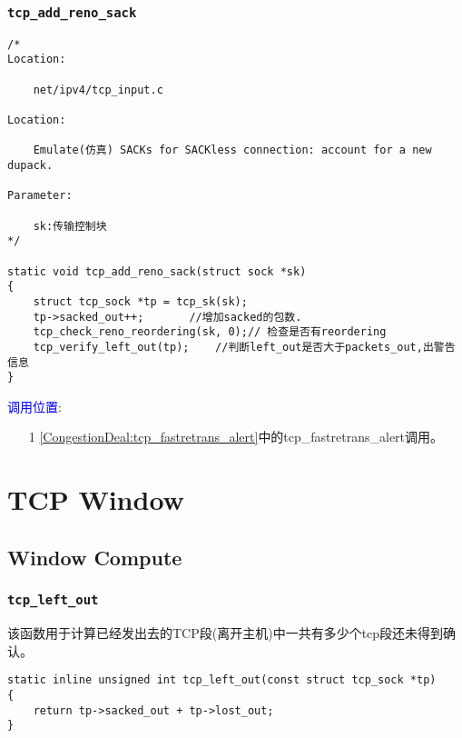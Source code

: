         \subsubsection{\texttt{tcp_add_reno_sack}}
            \label{ACKUpdate:tcp_add_reno_sack}
\begin{verbatim}
/* 
Location:

    net/ipv4/tcp_input.c

Location:

    Emulate(仿真) SACKs for SACKless connection: account for a new dupack.

Parameter:

    sk:传输控制块
*/

static void tcp_add_reno_sack(struct sock *sk)
{
    struct tcp_sock *tp = tcp_sk(sk);
    tp->sacked_out++;       //增加sacked的包数.
    tcp_check_reno_reordering(sk, 0);// 检查是否有reordering
    tcp_verify_left_out(tp);    //判断left_out是否大于packets_out,出警告信息
}
\end{verbatim}

        \textcolor{blue}{调用位置}:
            \begin{enumerate}
                \item[1]       \ref{CongestionDeal:tcp_fastretrans_alert}中的tcp\_fastretrans\_alert调用。
            \end{enumerate}

\section{TCP Window}
    \subsection{Window Compute}
        \subsubsection{\texttt{tcp_left_out}}
            该函数用于计算已经发出去的TCP段(离开主机)中一共有多少个tcp段还未得到确认。
\begin{verbatim}
static inline unsigned int tcp_left_out(const struct tcp_sock *tp)
{
    return tp->sacked_out + tp->lost_out;
}
\end{verbatim}
